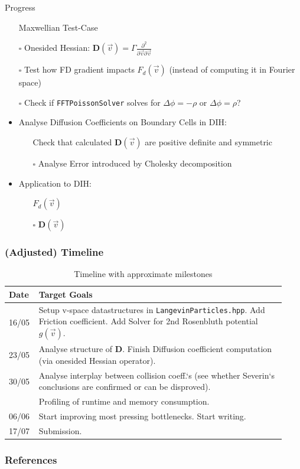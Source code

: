 \begin{frame}{Progress}
    \begin{itemize}
        \item[\done] Maxwellian Test-Case
        \item[$\square$] Onesided Hessian: $\boldsymbol D(\vec v) = \Gamma \frac{\partial^2}{\partial \vec v \partial \vec v}$
        \item[$\square$] Test how FD gradient impacts $F_d(\vec v)$ (instead of computing it in Fourier space)
        \item[$\square$] Check if \texttt{FFTPoissonSolver} solves for $\Delta \phi=-\rho$ or $\Delta \phi=\rho$?
        \item Analyse Diffusion Coefficients on Boundary Cells in DIH:
        \begin{itemize}
            \item[\done] Check that calculated $\boldsymbol D(\vec v)$ are positive definite and symmetric 
            \item[$\square$] Analyse Error introduced by Cholesky decomposition
        \end{itemize}
        \item Application to DIH:
        \begin{itemize}
            \item[\done] $F_d(\vec v)$
            \item[$\square$] $\boldsymbol D(\vec v)$
        \end{itemize}
    \end{itemize}
\end{frame}

\begin{frame}
\frametitle{(Adjusted) Timeline}

\begin{table}[]
    \def\arraystretch{1.5}
    \begin{tabular}{p{0.08\linewidth} | p{0.85\linewidth}}
        Date & Target Goals \\
        \hline \hline
        16/05 & Setup v-space datastructures in \texttt{LangevinParticles.hpp}. Add Friction coefficient. Add Solver for 2nd Rosenbluth potential $g(\vec v)$.\\
        23/05 & Analyse structure of $\boldsymbol D$. Finish Diffusion coefficient computation (via onesided Hessian operator). \\
        30/05 & Analyse interplay between collision coeff.`s (see whether Severin`s conclusions are confirmed or can be disproved). \\
              & Profiling of runtime and memory consumption. \\
        06/06 & Start improving most pressing bottlenecks. Start writing. \\
        17/07 & Submission. \\
    \end{tabular}
    \caption{Timeline with approximate milestones}
\end{table}

\end{frame}

\begin{frame}[allowframebreaks]
	\frametitle{References}
	
	
\end{frame}


